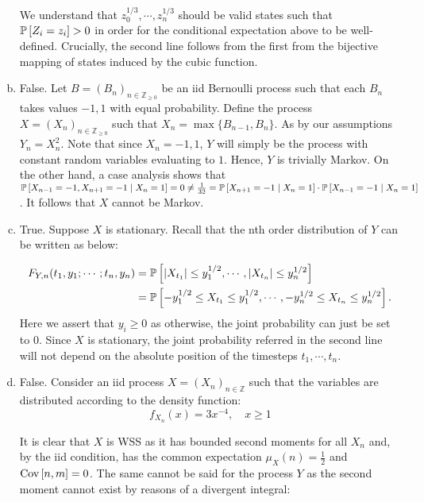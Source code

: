 \documentclass[12pt]{article}%
\begin{document}
\begin{enumerate}[a.]
        We understand that $z_0^{1/3},\cdots, z_n^{1/3}$ should be valid states such that $\mathbb{P}\left[Z_{i} = z_{i}\right] > 0$ in order for the conditional expectation above to be well-defined. Crucially, the second line follows from the first from the bijective mapping of states induced by the cubic function.

  \item
        False. Let $B = (B_{n})_{n \in \mathbb{Z}_{\geq 0}}$ be an iid Bernoulli process such that each $B_{n}$ takes values $-1,1$ with equal probability. Define the process $X = (X_{n})_{n \in \mathbb{Z}_{\geq 0}}$ such that $X_n = \max\{B_{n-1},B_{n}\}$. As by our assumptions $Y_n = X_n^{2}$. Note that since $X_n = -1,1$, $Y$ will simply be the process with constant random variables evaluating to $1$. Hence, $Y$ is trivially Markov. On the other hand, a case analysis shows that $\mathbb{P}\left[X_{n-1} = -1, X_{n+1} = -1 \mid X_{n} = 1\right]  = 0 \neq \frac{1}{32} = \mathbb{P}\left[X_{n+1} = -1 \mid X_{n} = 1\right]\cdot \mathbb{P}\left[X_{n-1} = -1 \mid X_{n} = 1\right]$. It follows that $X$ cannot be Markov.

  \item
        True. Suppose $X$ is stationary. Recall that the nth order distribution of $Y$ can be written as below:

        \begin{align*}
          F_{Y,n}(t_1,y_1;\cdots;t_n,y_{n})  & = \mathbb{P}\left[\abs{X_{t_1}} \leq y_{1}^{1/2}, \cdots,\abs{X_{t_n}} \leq y_{n}^{1/2}\right] \\
          & = \mathbb{P}\left[-y_{1}^{1/2} \leq X_{t_1} \leq y_{1}^{1/2}, \cdots,-y_{n}^{1/2} \leq X_{t_n} \leq y_{n}^{1/2}\right].
        \end{align*}
        Here we assert that $y_i \geq 0$ as otherwise, the joint probability can just be set to 0. Since $X$ is stationary, the joint probability referred in the second line will not depend on the absolute position of the timesteps $t_1,\cdots,t_n$.

  \item
        False. Consider an iid process $X = (X_{n})_{n \in \mathbb{Z}}$ such that the variables are distributed according to the density function:
        \[f_{X_{n}}(x) = 3x^{-4}, \quad x \geq 1\]

        It is clear that $X$ is WSS as it has bounded second moments for all $X_n$ and, by the iid condition, has the common expectation $\mu_{X}(n) = \frac{1}{2}$ and $\text{Cov}\left[n,m\right] = 0$. The same cannot be said for the process $Y$ as the second moment cannot exist by reasons of a divergent integral:


\end{enumerate}
\end{document}

